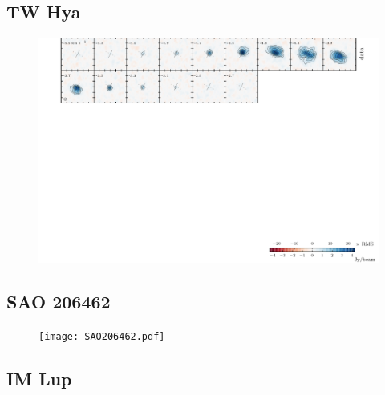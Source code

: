 \documentclass[twocolumn]{aastex6}
\begin{document}
\subsection{TW Hya}

\begin{figure}[htb]
\begin{center}
  \includegraphics[draft]{TWHya.pdf}
  \end{center}
\end{figure}

\subsection{SAO 206462}

\begin{figure}[htb]
\begin{center}
  \texttt{[image: SAO206462.pdf]}
  \end{center}
\end{figure}

\subsection{IM Lup}
\end{document}
